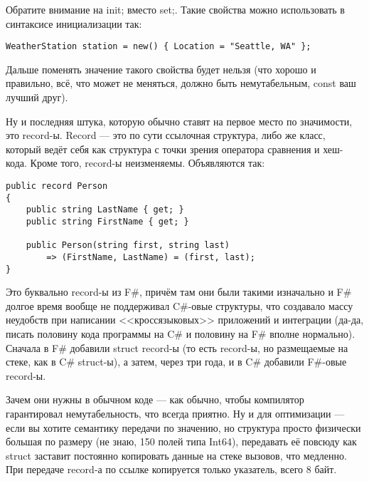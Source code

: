 \documentclass[a5paper]{article}
\begin{document}
Обратите внимание на init; вместо set;. Такие свойства можно использовать в синтаксисе инициализации так:

\begin{verbatim}
WeatherStation station = new() { Location = "Seattle, WA" };
\end{verbatim}

Дальше поменять значение такого свойства будет нельзя (что хорошо и правильно, всё, что может не меняться, должно быть немутабельным, const ваш лучший друг).

Ну и последняя штука, которую обычно ставят на первое место по значимости, это record-ы. Record --- это по сути ссылочная структура, либо же класс, который ведёт себя как структура с точки зрения оператора сравнения и хеш-кода. Кроме того, record-ы неизменяемы. Объявляются так:

\begin{verbatim}
public record Person
{
    public string LastName { get; }
    public string FirstName { get; }

    public Person(string first, string last) 
        => (FirstName, LastName) = (first, last);
}
\end{verbatim}

Это буквально record-ы из F\#, причём там они были такими изначально и F\# долгое время вообще не поддерживал C\#-овые структуры, что создавало массу неудобств при написании <<кроссязыковых>> приложений и интеграции (да-да, писать половину кода программы на C\# и половину на F\# вполне нормально). Сначала в F\# добавили struct record-ы (то есть record-ы, но размещаемые на стеке, как в C\# struct-ы), а затем, через три года, и в C\# добавили F\#-овые record-ы.

Зачем они нужны в обычном коде --- как обычно, чтобы компилятор гарантировал немутабельность, что всегда приятно. Ну и для оптимизации --- если вы хотите семантику передачи по значению, но структура просто физически большая по размеру (не знаю, 150 полей типа Int64), передавать её повсюду как struct заставит постоянно копировать данные на стеке вызовов, что медленно. При передаче record-а по ссылке копируется только указатель, всего 8 байт.
\end{document}
